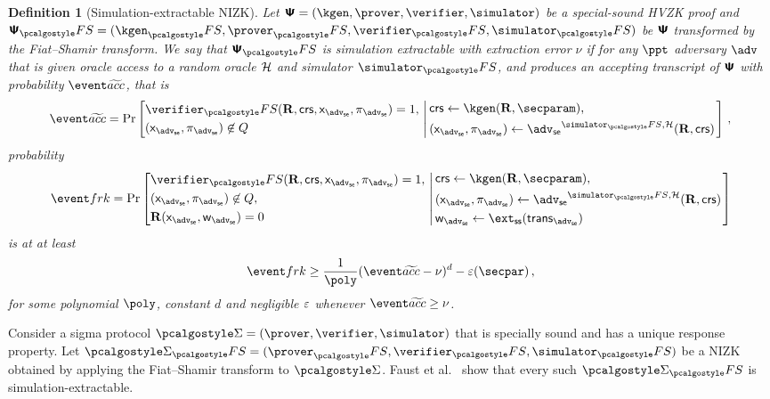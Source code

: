 \let\accentvec\vec \documentclass[runningheads,10pt]{llncs}
\newtheorem{definition}[theorem]{Definition}
\begin{document}
\begin{definition}[Simulation-extractable NIZK]
	\label{def:simext}
	Let $\ps = (\kgen, \prover, \verifier, \simulator)$ be a special-sound HVZK proof and $\ps_\fs = (\kgen_\fs, \prover_\fs, \verifier_\fs, \simulator_\fs)$ be $\bm{\mathsf{\Psi}}$ transformed by the Fiat--Shamir transform. 
	We say that $\ps_\fs$ is simulation extractable with \emph{extraction error} $\nu$ if for any $\ppt$ adversary $\adv$ that is given oracle access to a random oracle $\mathcal{H}$ and simulator $\simulator_\fs$, and produces an accepting transcript of $\bm{\mathsf{\Psi}}$ with probability
	$\waccProb$, that is
	\[
		\waccProb = \Pr \left[
		\begin{aligned}
			& \verifier_\fs(\REL, \crs, \inp_\advse, \zkproof_\advse) = 1,\\
			& (\inp_\advse, \zkproof_\advse) \not\in Q
		\end{aligned}
		\, \left| \,
		\begin{aligned}
			& \crs \gets \kgen(\REL, \secparam),\\
			& (\inp_\advse, \zkproof_\advse) \gets \advse^{\simulator_\fs, \ro} (\REL, \crs) 
		\end{aligned}
		\right.\right]\,,
	\]
	probability
	\[
		\frkProb = \Pr \left[
		\begin{aligned}
			& \verifier_\fs(\REL, \crs, \inp_\advse, \zkproof_\advse) = 1,\\
			& (\inp_\advse, \zkproof_\advse) \not\in Q,\\
			& \REL(\inp_\advse, \wit_\advse) = 0
		\end{aligned}
		\, \left| \,
		\begin{aligned}
			& \crs \gets \kgen(\REL, \secparam),\\
			& (\inp_\advse, \zkproof_\advse) \gets \advse^{\simulator_\fs, \ro} (\REL, \crs) \\
			& \wit_\advse \gets \ext_\ss (\trans_{\advse}) 
		\end{aligned}
		\right.\right]
	\]
	is at at least 
	\[
		\frkProb \geq \frac{1}{\poly} (\waccProb - \nu)^d - \eps(\secpar)\,,
	\]
	for some polynomial $\poly$, constant $d$ and negligible $\varepsilon$ whenever $\waccProb \geq \nu$.
\end{definition}

Consider a sigma protocol $\sigmaprot = (\prover, \verifier, \simulator)$ that
is specially sound and has a unique response property. Let $\sigmaprot_\fs = (\prover_\fs, \verifier_\fs, \simulator_\fs)$ be a NIZK obtained by applying the Fiat--Shamir transform to $\sigmaprot$.
Faust et al.~\cite{INDOCRYPT:FKMV12} show that every such $\sigmaprot_\fs$ is simulation-extractable.
\end{document}
